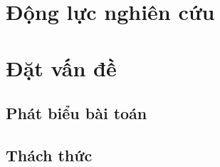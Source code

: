 











\section{Động lực nghiên cứu}


\section{Đặt vấn đề}
	\subsection{Phát biểu bài toán}
    \subsection{Thách thức}
